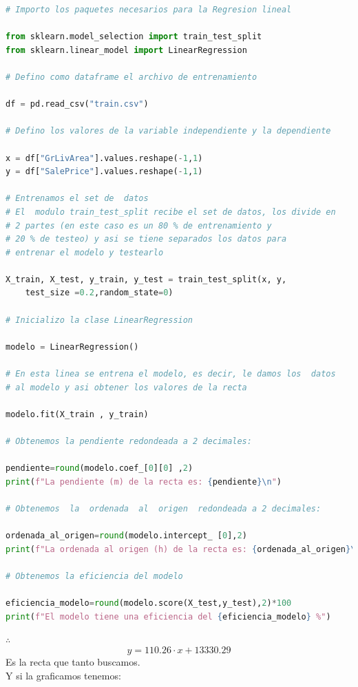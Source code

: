 \documentclass{article}
\begin{document}
\begin{lstlisting}[language=Python]
# Importo los paquetes necesarios para la Regresion lineal

from sklearn.model_selection import train_test_split
from sklearn.linear_model import LinearRegression

# Defino como dataframe el archivo de entrenamiento

df = pd.read_csv("train.csv")

# Defino los valores de la variable independiente y la dependiente

x = df["GrLivArea"].values.reshape(-1,1)
y = df["SalePrice"].values.reshape(-1,1)

# Entrenamos el set de  datos
# El  modulo train_test_split recibe el set de datos, los divide en
# 2 partes (en este caso es un 80 % de entrenamiento y
# 20 % de testeo) y asi se tiene separados los datos para
# entrenar el modelo y testearlo

X_train, X_test, y_train, y_test = train_test_split(x, y,
    test_size =0.2,random_state=0)

# Inicializo la clase LinearRegression

modelo = LinearRegression()

# En esta linea se entrena el modelo, es decir, le damos los  datos
# al modelo y asi obtener los valores de la recta

modelo.fit(X_train , y_train)

# Obtenemos la pendiente redondeada a 2 decimales:

pendiente=round(modelo.coef_[0][0] ,2)
print(f"La pendiente (m) de la recta es: {pendiente}\n")

# Obtenemos  la  ordenada  al  origen  redondeada a 2 decimales:

ordenada_al_origen=round(modelo.intercept_ [0],2)
print(f"La ordenada al origen (h) de la recta es: {ordenada_al_origen}\n")

# Obtenemos la eficiencia del modelo

eficiencia_modelo=round(modelo.score(X_test,y_test),2)*100
print(f"El modelo tiene una eficiencia del {eficiencia_modelo} %")
\end{lstlisting}
$\therefore$
\begin{equation*}
    y=110.26\cdot x+13330.29
\end{equation*}
Es la recta que tanto buscamos.\\
Y si la graficamos tenemos:
\end{document}
